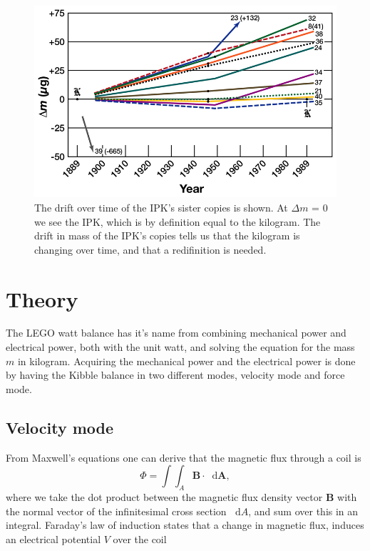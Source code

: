 \documentclass[english,a4paper,12pt,reprint]{revtex4-1}
\newcommand*\diff{\mathop{}\!\mathrm{d}}
\begin{document}
\begin{figure}
  \centering
  \includegraphics[scale=0.305]{Prototype_mass_drifts.jpg}
  \caption{The drift over time of the IPK's sister copies is shown. At $\Delta m$ = 0 we see the IPK, which is by definition equal to the kilogram. The drift in mass of the IPK's copies tells us that the kilogram is changing over time, and that a redifinition is needed.}
  \label{drift_kg}
\end{figure}

\section{Theory}
The LEGO watt balance has it's name from combining mechanical power and electrical power, both with the unit watt, and solving the equation for the mass $m$ in kilogram. Acquiring the mechanical power and the electrical power is done by having the Kibble balance in two different modes, velocity mode and force mode.


\subsection{Velocity mode}
From Maxwell's equations one can derive that the magnetic flux through a coil is
\begin{equation}
\Phi = \int\int_A \bm{B} \cdot \diff \bm{A},
\end{equation}
where we take the dot product between the magnetic flux density vector $\bm{B}$ with the  normal vector of the infinitesimal cross section $\diff A$, and sum over this in an integral. Faraday's law of induction states that a change in magnetic flux, induces an electrical potential $V$ over the coil
\end{document}

